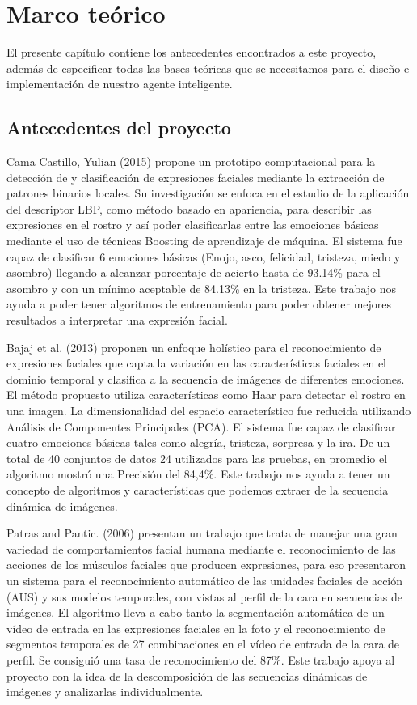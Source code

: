\chapter{Marco teórico}

El presente capítulo contiene los antecedentes encontrados a este proyecto, además de especificar todas las bases teóricas que se necesitamos para el diseño e implementación de nuestro agente inteligente.

\section{Antecedentes del proyecto}

Cama Castillo, Yulian (2015) propone un prototipo computacional para la detección de y clasificación de expresiones faciales mediante la extracción de patrones binarios locales. Su investigación se enfoca en el estudio de la aplicación del descriptor LBP, como método basado en apariencia, para describir las expresiones en el rostro y así poder clasificarlas entre las emociones básicas mediante el uso de técnicas Boosting de aprendizaje de máquina. El sistema fue capaz de clasificar 6 emociones básicas (Enojo, asco, felicidad, tristeza, miedo y asombro) llegando a alcanzar porcentaje de acierto hasta de 93.14\% para el asombro y con un mínimo aceptable de 84.13\% en la tristeza. Este trabajo nos ayuda a poder tener algoritmos de entrenamiento para poder obtener mejores resultados a interpretar una expresión facial.
\vskip 0.1cm

Bajaj et al. (2013) proponen un enfoque holístico para el reconocimiento de expresiones faciales que capta la variación en las características faciales en el dominio temporal y clasifica a la secuencia de imágenes de diferentes emociones. El método propuesto utiliza características como Haar para detectar el rostro en una imagen. La dimensionalidad del espacio característico fue reducida utilizando Análisis de Componentes Principales (PCA). El sistema fue capaz de clasificar cuatro emociones básicas tales como alegría, tristeza, sorpresa y la ira. De un total de 40 conjuntos de datos 24 utilizados para las pruebas, en promedio el algoritmo mostró una Precisión del 84,4\%. Este trabajo nos ayuda a tener un concepto de algoritmos y características que podemos extraer de la secuencia dinámica de imágenes. 
\vskip 0.1cm

Patras and Pantic. (2006) presentan un trabajo que trata de manejar una gran variedad de comportamientos facial humana mediante el reconocimiento de las acciones de los músculos faciales que producen expresiones, para eso presentaron un sistema para el reconocimiento automático de las unidades faciales de acción (AUS) y sus modelos temporales, con vistas al perfil de la cara en secuencias de imágenes. El algoritmo lleva a cabo tanto la segmentación automática de un vídeo de entrada en las expresiones faciales en la foto y el reconocimiento de segmentos temporales de 27 combinaciones en el vídeo de entrada de la cara de perfil. Se consiguió una tasa de reconocimiento del 87\%. Este trabajo apoya al proyecto con la idea de la descomposición de las secuencias dinámicas de imágenes y analizarlas individualmente. 

